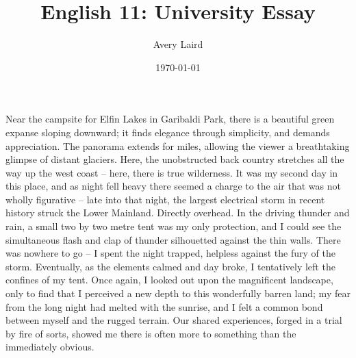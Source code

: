 \documentclass[letterpaper,10pt,oneside,headsepline]{scrreprt}
\author{Avery Laird}
\title{English 11: University Essay}
\date{\today}
\begin{document}
Near the campsite for Elfin Lakes in Garibaldi Park, there is a beautiful green expanse sloping downward; it finds elegance through simplicity, and demands appreciation. The panorama extends for miles, allowing the viewer a breathtaking glimpse of distant glaciers. Here, the unobstructed back country stretches all the way up the west coast -- here, there is true wilderness. It was my second day in this place, and as night fell heavy there seemed a charge to the air that was not wholly figurative -- late into that night, the largest electrical storm in recent history struck the Lower Mainland. Directly overhead. In the driving thunder and rain, a small two by two metre tent was my only protection, and I could see the simultaneous flash and clap of thunder silhouetted against the thin walls. There was nowhere to go -- I spent the night trapped, helpless against the fury of the storm. Eventually, as the elements calmed and day broke, I tentatively left the confines of my tent. Once again, I looked out upon the magnificent landscape, only to find that I perceived a new depth to this wonderfully barren land; my fear from the long night had melted with the sunrise, and I felt a common bond between myself and the rugged terrain. Our shared experiences, forged in a trial by fire of sorts, showed me there is often more to something than the immediately obvious.            
\end{document}
